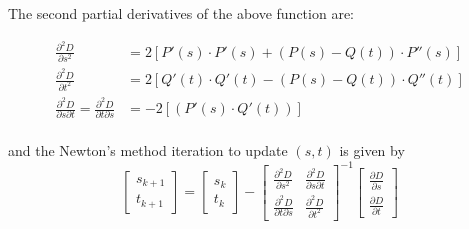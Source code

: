\documentclass[11pt]{article}
\begin{document}
The second partial derivatives of the above function are:

\begin{align*}
  \frac{\partial^2 D}{\partial s^2}          & = 2\left[P'(s) \cdot P'(s) + (P(s) - Q(t)) \cdot P''(s)\right] \\
  \frac{\partial^2 D}{\partial t^2}          & = 2\left[Q'(t) \cdot Q'(t) - (P(s) - Q(t)) \cdot Q''(t)\right] \\
  \frac{\partial^2 D}{\partial s \partial t} =
  \frac{\partial^2 D}{\partial t \partial s} & = -2\left[(P'(s)  \cdot  Q'(t))\right]                         \\
\end{align*}

and the Newton's method iteration to update $(s,t)$ is given by
$$
  \begin{bmatrix}
    s_{k+1} \\t_{k+1}
  \end{bmatrix}
  =
  \begin{bmatrix}
    s_{k} \\t_{k}
  \end{bmatrix}
  -
  \begin{bmatrix}
    \frac{\partial^2 D}{\partial s^2}          & \frac{\partial^2 D}{\partial s \partial t} \\
    \frac{\partial^2 D}{\partial t \partial s} & \frac{\partial^2 D}{\partial t^2}
  \end{bmatrix}^{-1}
  \begin{bmatrix}
    \frac{\partial D}{\partial s} \\
    \frac{\partial D}{\partial t}
  \end{bmatrix}
$$
\end{document}
